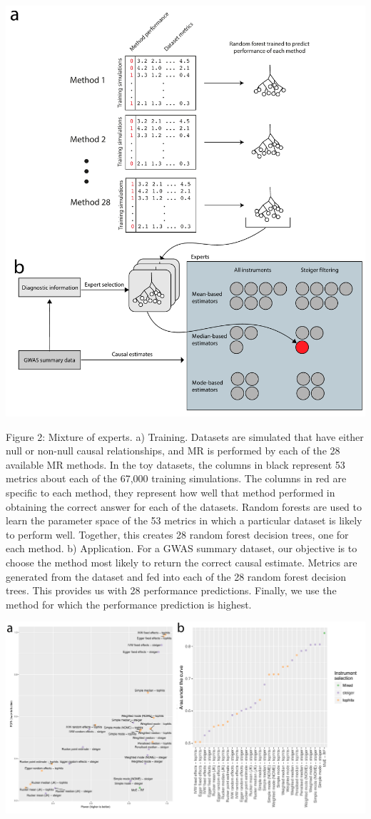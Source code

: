 \documentclass[]{article}
\begin{document}
\includegraphics{images/fig2.pdf}

Figure 2: Mixture of experts. a) Training. Datasets are simulated that
have either null or non-null causal relationships, and MR is performed
by each of the 28 available MR methods. In the toy datasets, the columns
in black represent 53 metrics about each of the 67,000 training
simulations. The columns in red are specific to each method, they
represent how well that method performed in obtaining the correct answer
for each of the datasets. Random forests are used to learn the parameter
space of the 53 metrics in which a particular dataset is likely to
perform well. Together, this creates 28 random forest decision trees,
one for each method. b) Application. For a GWAS summary dataset, our
objective is to choose the method most likely to return the correct
causal estimate. Metrics are generated from the dataset and fed into
each of the 28 random forest decision trees. This provides us with 28
performance predictions. Finally, we use the method for which the
performance prediction is highest.

\newpage

\includegraphics{images/fig3.pdf}
\end{document}
